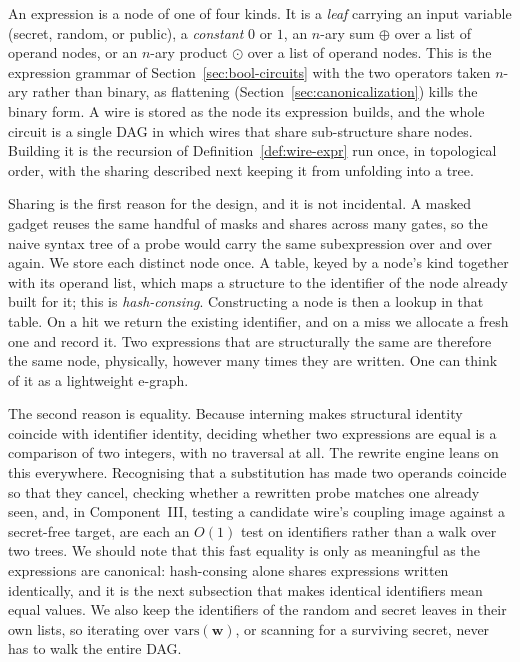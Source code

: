   An expression is a node of one of four kinds. It is a \emph{leaf} carrying an
  input variable (secret, random, or public), a \emph{constant} $0$ or $1$, an
  $n$-ary sum $\oplus$ over a list of operand nodes, or an $n$-ary product
  $\odot$ over a list of operand nodes. This is the expression grammar of
  Section~\ref{sec:bool-circuits} with the two operators taken $n$-ary rather than
  binary, as flattening (Section~\ref{sec:canonicalization}) kills the
  binary form. A wire is stored as the node its expression
  builds, and the whole circuit is a single DAG in which wires that
  share sub-structure share nodes. Building it is the recursion of
  Definition~\ref{def:wire-expr} run once, in topological order, with the sharing
  described next keeping it from unfolding into a tree.

  Sharing is the first reason for the design, and it is not incidental. A masked
  gadget reuses the same handful of masks and shares across many gates, so the
  naive syntax tree of a probe would carry the same subexpression over and over again.
  We store each distinct node once. A table, keyed by a node's kind together with
  its operand list, which maps a structure to the identifier of the node already built
  for it; this is \emph{hash-consing}. Constructing a node is then a lookup in
  that table. On a hit we return the existing identifier, and on a miss we
  allocate a fresh one and record it. Two expressions that are structurally the
  same are therefore the same node, physically, however many times they are
  written. One can think of it as a lightweight e-graph.

  The second reason is equality. Because interning makes structural identity
  coincide with identifier identity, deciding whether two expressions are equal
  is a comparison of two integers, with no traversal at all. The rewrite engine
  leans on this everywhere. Recognising that a substitution has made two operands
  coincide so that they cancel, checking whether a rewritten probe matches one
  already seen, and, in Component~III, testing a candidate wire's coupling image
  against a secret-free target, are each an $O(1)$ test on identifiers rather than
  a walk over two trees. We should note that this fast equality is only as
  meaningful as the expressions are canonical: hash-consing alone shares
  expressions written identically, and it is the next subsection that makes
  identical identifiers mean equal values. We also keep the identifiers of the
  random and secret leaves in their own lists, so iterating over
  $\mathrm{vars}(\mathbf{w})$, or scanning for a surviving secret, never has to
  walk the entire DAG.

